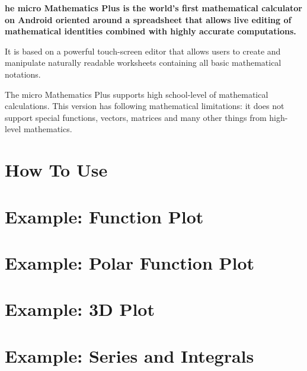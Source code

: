 \documentclass[DIV=calc, paper=a4, fontsize=11pt, twocolumn]{scrartcl}
\begin{document}
\maketitle
\thispagestyle{fancy} %

\textbf{he micro Mathematics Plus is the world's first mathematical
calculator on Android oriented around a spreadsheet that allows live editing
of mathematical identities combined with highly accurate computations.}

\begin{bf}
It is based on a powerful touch-screen editor that allows users to
create and manipulate naturally readable worksheets containing all basic mathematical
notations.

The micro Mathematics Plus supports high school-level of mathematical
calculations. This version has following mathematical limitations: it does not
support special functions, vectors, matrices and many other things from
high-level mathematics.
\end{bf}

\section{How To Use}


\section{Example: Function Plot}


\section{Example: Polar Function Plot}


\section{Example: 3D Plot}


\section{Example: Series and Integrals}

\end{document}

